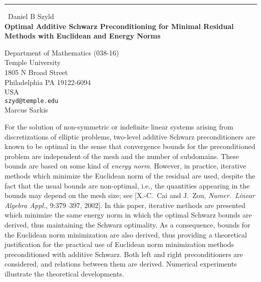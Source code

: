 \documentclass{report}
\begin{document}
\begin{center}
\rule{6in}{1pt} \
{\large Daniel B Szyld \\
{\bf Optimal Additive Schwarz Preconditioning for Minimal Residual Methods with Euclidean and Energy Norms}}

Department of Mathematics (038-16) \\ Temple University \\ 1805 N Broad Street \\ Philadelphia PA 19122-6094 \\ USA
\\
{\tt szyd@temple.edu}\\
Marcus Sarkis\end{center}

For the solution of non-symmetric or indefinite linear
systems arising from discretizations of elliptic problems,
two-level additive Schwarz preconditioners are known
to be optimal in the sense that convergence bounds
for the preconditioned problem are
independent of the mesh and the number of subdomains.
These bounds are based on some kind of {\em energy norm}.
However, in practice, iterative methods which
minimize the Euclidean norm of the residual are used,
despite the fact that the usual bounds are non-optimal, i.e.,
the quantities appearing in the bounds may depend on
the mesh size; see [X.-C.\ Cai and J.\ Zou,
{\em Numer.\ Linear Algebra Appl.}, 9:379--397, 2002].
In this paper,
iterative methods are presented which minimize the same
energy norm in which the optimal Schwarz bounds are derived,
thus maintaining the Schwarz optimality.
As a consequence, bounds for the Euclidean norm minimization
are also derived, thus providing a theoretical justification
for the practical use of Euclidean norm minimization methods
preconditioned with additive Schwarz.
Both left and right preconditioners are considered, and
relations between them are derived. Numerical experiments
illustrate the theoretical developments.
\end{document}
